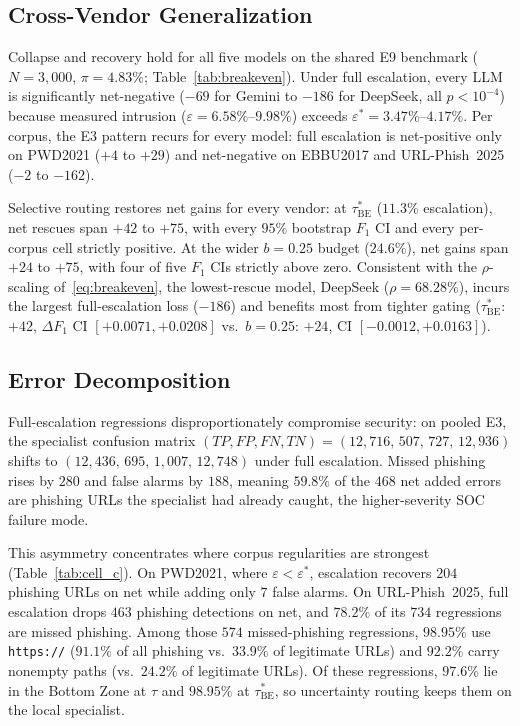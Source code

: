 \documentclass[conference,a4paper]{IEEEtran}
\newcommand{\eps}{\varepsilon}
\newcommand{\epsstar}{\eps^{\ast}}
\newcommand{\rrescue}{\rho}
\begin{document}
\subsection{Cross-Vendor Generalization}
Collapse and recovery hold for all five models on the shared E9 benchmark
($N=3{,}000$, $\pi=4.83\%$; Table~\ref{tab:breakeven}). Under full escalation, every
LLM is significantly net-negative ($-69$ for Gemini to $-186$ for DeepSeek, all
$p<10^{-4}$) because measured intrusion ($\eps=6.58\%$--$9.98\%$) exceeds
$\epsstar=3.47\%$--$4.17\%$. Per corpus, the E3 pattern recurs for every model: full
escalation is net-positive only on PWD2021 ($+4$ to $+29$) and net-negative on
EBBU2017 and URL-Phish~2025 ($-2$ to $-162$).

Selective routing restores net gains for every vendor: at $\tau^{\ast}_{\mathrm{BE}}$
($11.3\%$ escalation), net rescues span $+42$ to $+75$, with every $95\%$ bootstrap
$F_1$ CI and every per-corpus cell strictly positive. At the wider $b=0.25$ budget
($24.6\%$), net gains span $+24$ to $+75$, with four of five $F_1$ CIs strictly above
zero. Consistent with the $\rrescue$-scaling of~\eqref{eq:breakeven}, the
lowest-rescue model, DeepSeek ($\rrescue=68.28\%$), incurs the largest
full-escalation loss ($-186$) and benefits most from tighter gating
($\tau^{\ast}_{\mathrm{BE}}$: $+42$, $\Delta F_1$ CI $[+0.0071,+0.0208]$ vs.\ $b=0.25$: $+24$, CI
$[-0.0012,+0.0163]$).

\subsection{Error Decomposition}
Full-escalation regressions disproportionately compromise security: on pooled E3, the
specialist confusion matrix
$(\mathit{TP},\mathit{FP},\mathit{FN},\mathit{TN})=(12{,}716,\,507,\,727,\,12{,}936)$
shifts to $(12{,}436,\,695,\,1{,}007,\,12{,}748)$ under full escalation. Missed
phishing rises by $280$ and false alarms by $188$, meaning $59.8\%$ of the $468$ net
added errors are phishing URLs the specialist had already caught, the higher-severity
SOC failure mode.

This asymmetry concentrates where corpus regularities are strongest
(Table~\ref{tab:cell_c}). On PWD2021, where $\eps<\epsstar$, escalation recovers
$204$ phishing URLs on net while adding only $7$ false alarms. On URL-Phish~2025,
full escalation drops $463$ phishing detections on net, and $78.2\%$ of its $734$
regressions are missed phishing. Among those $574$ missed-phishing regressions,
$98.95\%$ use \texttt{https://} ($91.1\%$ of all phishing vs.\ $33.9\%$ of legitimate
URLs) and $92.2\%$ carry nonempty paths (vs.\ $24.2\%$ of legitimate URLs).
Of these regressions, $97.6\%$ lie in the Bottom Zone at $\tau$ and $98.95\%$ at
$\tau^{\ast}_{\mathrm{BE}}$, so uncertainty routing keeps them on the local specialist.
\end{document}
